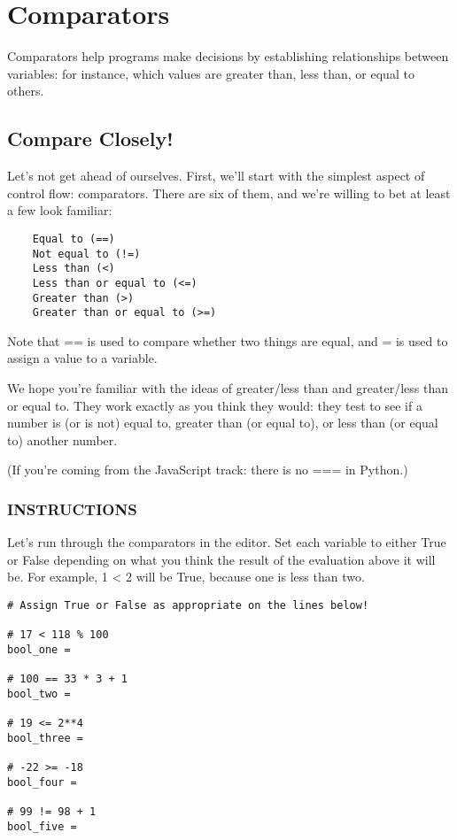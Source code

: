 \documentclass[12pt,a4paper,final,twoside,onecolumn,titlepage]{book}
\begin{document}
\section{Comparators}
Comparators help programs make decisions by establishing relationships between variables: for instance, which values are greater than, less than, or equal to others.
    
\subsection{Compare Closely!}

Let's not get ahead of ourselves. First, we'll start with the simplest aspect of control flow: comparators. There are six of them, and we're willing to bet at least a few look familiar:
\begin{lstlisting}
    Equal to (==)
    Not equal to (!=)
    Less than (<)
    Less than or equal to (<=)
    Greater than (>)
    Greater than or equal to (>=)
\end{lstlisting}
Note that == is used to compare whether two things are equal, and = is used to assign a value to a variable.

We hope you're familiar with the ideas of greater/less than and greater/less than or equal to. They work exactly as you think they would: they test to see if a number is (or is not) equal to, greater than (or equal to), or less than (or equal to) another number.

(If you're coming from the JavaScript track: there is no === in Python.)

\subsubsection{INSTRUCTIONS}

Let's run through the comparators in the editor. Set each variable to either True or False depending on what you think the result of the evaluation above it will be. For example, 1 < 2 will be True, because one is less than two.

\begin{lstlisting}
# Assign True or False as appropriate on the lines below!

# 17 < 118 % 100
bool_one = 

# 100 == 33 * 3 + 1
bool_two = 

# 19 <= 2**4
bool_three = 

# -22 >= -18
bool_four = 

# 99 != 98 + 1
bool_five = 
\end{lstlisting}
\end{document}
